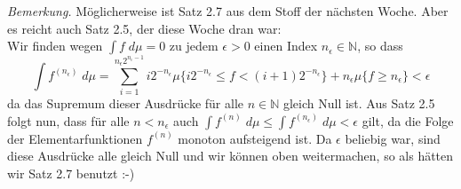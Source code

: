 \documentclass[10pt]{article}
\begin{document}
\textit{Bemerkung. }  Möglicherweise ist Satz 2.7 aus dem Stoff der nächsten Woche. Aber es reicht auch Satz 2.5, der diese Woche dran war: \\
Wir finden wegen $\int f \; d\mu = 0$ zu jedem $\epsilon > 0$ einen Index $n_\epsilon \in \mathbb{N}$, so dass 
$$
\int f^{(n_\epsilon)} \; d\mu = \sum_{i=1}^{n_\epsilon2^{n_\epsilon-1}} i2^{-n_\epsilon} \mu\{i2^{-n_\epsilon} \leq f < (i+1)2^{-n_\epsilon}\} + n_\epsilon \mu\{f \geq n_\epsilon\} < \epsilon
$$
da das Supremum dieser Ausdrücke für alle $n \in \mathbb{N}$ gleich Null ist. Aus Satz 2.5 folgt nun, dass für alle $n < n_\epsilon$ auch $\int f^{(n)} \; d\mu  \leq \int f^{(n_\epsilon)} \; d\mu < \epsilon$ gilt, da die Folge der Elementarfunktionen $f^{(n)}$ monoton aufsteigend ist. 
Da $\epsilon$ beliebig war, sind diese Ausdrücke alle gleich Null und wir können oben weitermachen, so als hätten wir Satz 2.7 benutzt :-)
\end{document}
